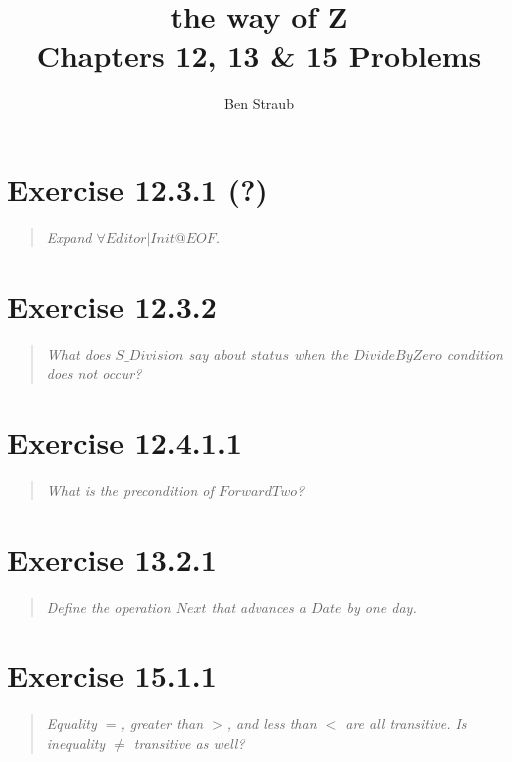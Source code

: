 \documentclass[10pt]{article}
\begin{document}
\title{the way of Z \\ Chapters 12, 13 \& 15 Problems}
\author{Ben Straub}
\maketitle

\section{Exercise 12.3.1 (?)}
\begin{quote}
  {\it
    Expand $\forall Editor | Init @ EOF$.
  }
\end{quote}



\section{Exercise 12.3.2}
\begin{quote}
  {\it
    What does $S\_Division$ say about $status$ when the $DivideByZero$ condition does not occur?
  }
\end{quote}


\section{Exercise 12.4.1.1}
\begin{quote}
  {\it
   What is the precondition of $ForwardTwo$? 
  }
\end{quote}



\section{Exercise 13.2.1}
\begin{quote}
  {\it
    Define the operation $Next$ that advances a $Date$ by one day.
  }
\end{quote}



\section{Exercise 15.1.1}
\begin{quote}
  {\it
    Equality $=$, greater than $>$, and less than $<$ are all transitive. Is inequality $\neq$
    transitive as well?
  }
\end{quote}
\end{document}
